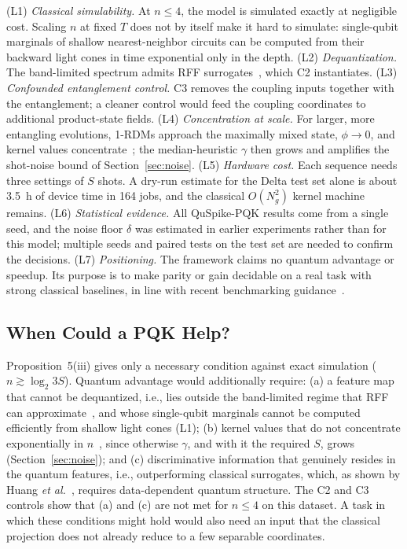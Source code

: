 \documentclass[conference]{IEEEtran}
\begin{document}
(L1) \emph{Classical simulability.} At $n\le4$, the model is simulated exactly at negligible cost. Scaling $n$ at fixed $T$ does not by itself make it hard to simulate: single-qubit marginals of shallow nearest-neighbor circuits can be computed from their backward light cones in time exponential only in the depth. (L2) \emph{Dequantization.} The band-limited spectrum admits RFF surrogates~\cite{schreiber2023surrogates,sweke2023rff}, which C2 instantiates. (L3) \emph{Confounded entanglement control.} C3 removes the coupling inputs together with the entanglement; a cleaner control would feed the coupling coordinates to additional product-state fields. (L4) \emph{Concentration at scale.} For larger, more entangling evolutions, 1-RDMs approach the maximally mixed state, $\phi\to0$, and kernel values concentrate~\cite{thanasilp2024concentration}; the median-heuristic $\gamma$ then grows and amplifies the shot-noise bound of Section~\ref{sec:noise}. (L5) \emph{Hardware cost.} Each sequence needs three settings of $S$ shots. A dry-run estimate for the Delta test set alone is about 3.5~h of device time in 164 jobs, and the classical $O(N_g^2)$ kernel machine remains. (L6) \emph{Statistical evidence.} All QuSpike-PQK results come from a single seed, and the noise floor $\delta$ was estimated in earlier experiments rather than for this model; multiple seeds and paired tests on the test set are needed to confirm the decisions. (L7) \emph{Positioning.} The framework claims no quantum advantage or speedup. Its purpose is to make parity or gain decidable on a real task with strong classical baselines, in line with recent benchmarking guidance~\cite{bowles2024better}.

\subsection{When Could a PQK Help?}
\label{sec:when}

Proposition~5(iii) gives only a necessary condition against exact simulation ($n\gtrsim\log_2 3S$). Quantum advantage would additionally require: (a) a feature map that cannot be dequantized, i.e., lies outside the band-limited regime that RFF can approximate~\cite{schreiber2023surrogates,sweke2023rff}, and whose single-qubit marginals cannot be computed efficiently from shallow light cones (L1); (b) kernel values that do not concentrate exponentially in $n$~\cite{thanasilp2024concentration}, since otherwise $\gamma$, and with it the required $S$, grows (Section~\ref{sec:noise}); and (c) discriminative information that genuinely resides in the quantum features, i.e., outperforming classical surrogates, which, as shown by Huang \textit{et al.}~\cite{huang2021power}, requires data-dependent quantum structure. The C2 and C3 controls show that (a) and (c) are not met for $n\le4$ on this dataset. A task in which these conditions might hold would also need an input that the classical projection does not already reduce to a few separable coordinates.
\end{document}
